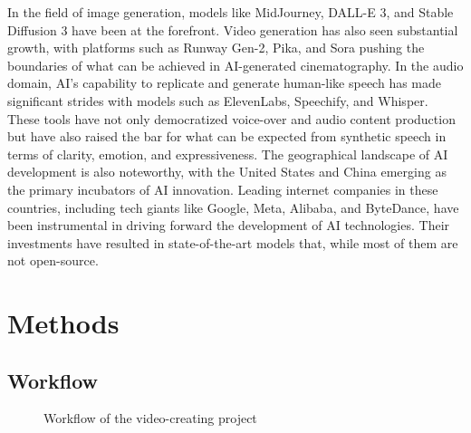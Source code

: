 \documentclass[11pt,a4paper,oneside]{report}
\begin{document}
In the field of image generation, models like MidJourney, DALL-E 3, and Stable Diffusion 3 have been at the forefront. 
Video generation has also seen substantial growth, with platforms such as Runway Gen-2, Pika, and Sora pushing the boundaries of what can be achieved in AI-generated cinematography. 
In the audio domain, AI's capability to replicate and generate human-like speech has made significant strides with models such as ElevenLabs, Speechify, and Whisper. 
These tools have not only democratized voice-over and audio content production but have also raised the bar for what can be expected from synthetic speech in terms of clarity, emotion, and expressiveness. 
The geographical landscape of AI development is also noteworthy, with the United States and China emerging as the primary incubators of AI innovation. 
Leading internet companies in these countries, including tech giants like Google, Meta, Alibaba, and ByteDance, have been instrumental in driving forward the development of AI technologies. 
Their investments have resulted in state-of-the-art models that, while most of them are not open-source.

\chapter{Methods}

\section{Workflow}

\begin{figure}[H]
\centering
{}
\caption{Workflow of the video-creating project}
\end{figure}
\end{document}
